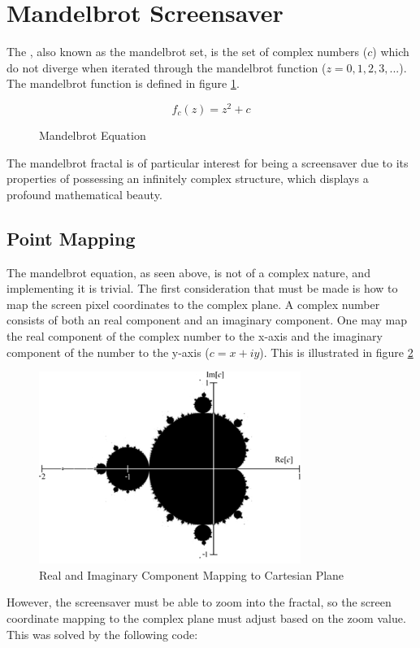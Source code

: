 \documentclass[10pt, openany]{book}
\begin{document}
\section{Mandelbrot Screensaver}

The , also known as the mandelbrot set, is the set of complex numbers ($c$) which do not diverge when iterated through the mandelbrot function ($z = 0, 1, 2, 3, ...$). The mandelbrot function is defined in figure \ref{fig:mandelbrot-equ}.

\begin{figure}[H]
	\centering
	\[ f_c(z) = z^2 + c \]
	\caption{Mandelbrot Equation}
	\label{fig:mandelbrot-equ}
\end{figure}	

The mandelbrot fractal is of particular interest for being a screensaver due to its properties of possessing an infinitely complex structure, which displays a profound mathematical beauty.

\subsection{Point Mapping}

The mandelbrot equation, as seen above, is not of a complex nature, and implementing it is trivial. The first consideration that must be made is how to map the screen pixel coordinates to the complex plane. A complex number consists of both an real component and an imaginary component. One may map the real component of the complex number to the x-axis and the imaginary component of the number to the y-axis ($c = x + iy$). This is illustrated in figure \ref{fig:mandelbrot-axis}

\begin{figure}[H]
	\centering
	\includegraphics[width=0.4\linewidth]{MandelbrotAxis}
	\caption{Real and Imaginary Component Mapping to Cartesian Plane}
	\label{fig:mandelbrot-axis}
\end{figure}	

However, the screensaver must be able to zoom into the fractal, so the screen coordinate mapping to the complex plane must adjust based on the zoom value. This was solved by the following code:
\end{document}

